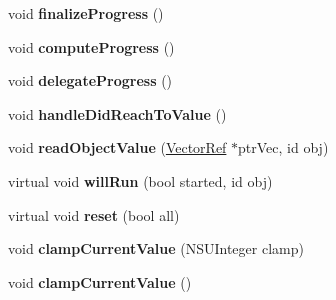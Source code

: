 \begin{DoxyCompactItemize}
void {\bfseries finalize\+Progress} ()
\item 
\mbox{\label{struct___p_o_p_property_animation_state_a15d1ddd5527abe19551d23bc77af74d3}} 
void {\bfseries compute\+Progress} ()
\item 
\mbox{\label{struct___p_o_p_property_animation_state_aaa73ffe40b5d907917915c1970ecd767}} 
void {\bfseries delegate\+Progress} ()
\item 
\mbox{\label{struct___p_o_p_property_animation_state_a945113ce3f4b94b199ba5bf8564e6ee3}} 
void {\bfseries handle\+Did\+Reach\+To\+Value} ()
\item 
\mbox{\label{struct___p_o_p_property_animation_state_aefaf4a1c55b5c0999987782b7b664d93}} 
void {\bfseries read\+Object\+Value} (\mbox{\hyperlink{namespace_p_o_p_ae9f6819a2172ed569526091e357712f5}{Vector\+Ref}} $\ast$ptr\+Vec, id obj)
\item 
\mbox{\label{struct___p_o_p_property_animation_state_aaaf8929284af57006cec636392e162a5}} 
virtual void {\bfseries will\+Run} (bool started, id obj)
\item 
\mbox{\label{struct___p_o_p_property_animation_state_a59824588af2468000ebbdd7f3365468b}} 
virtual void {\bfseries reset} (bool all)
\item 
\mbox{\label{struct___p_o_p_property_animation_state_aeedbe5578dbe7140b6dc94e2ed45e5c1}} 
void {\bfseries clamp\+Current\+Value} (N\+S\+U\+Integer clamp)
\item 
\mbox{\label{struct___p_o_p_property_animation_state_a8c121da1b918e46629befee66c3b104b}} 
void {\bfseries clamp\+Current\+Value} ()
\end{DoxyCompactItemize}
